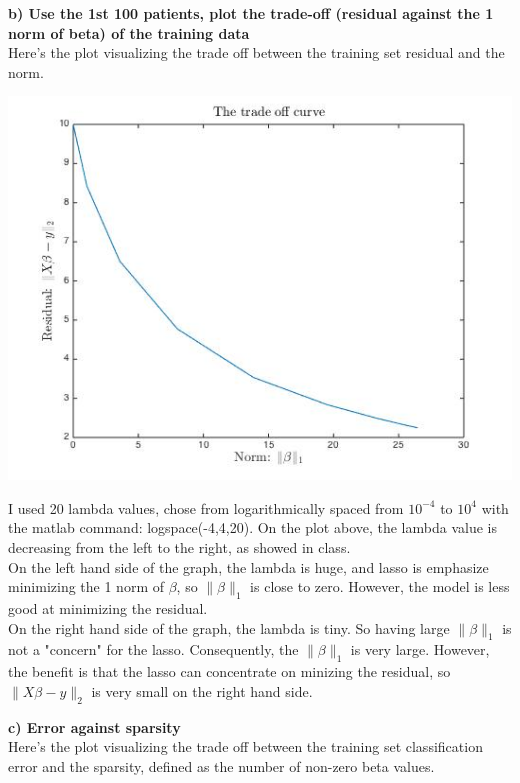 \documentclass[paper=a4, fontsize=11pt]{scrartcl} %
\numberwithin{equation}{section} %
\numberwithin{figure}{section} %
\numberwithin{table}{section} %
\begin{document}
\newpage
\textbf{b) Use the 1st 100 patients, plot the trade-off (residual against the 1 norm of beta) of the training data}\\

Here's the plot visualizing the trade off between the training set residual and the norm. 
\begin{center}
\includegraphics[scale=.5]{hw6_2b_tradeoff.jpg}
\end{center}

I used 20 lambda values, chose from logarithmically spaced from $10^{-4}$ to $10^{4}$ with the matlab command: logspace(-4,4,20). On the plot above, the lambda value is decreasing from the left to the right, as showed in class. \\

On the left hand side of the graph, the lambda is huge, and lasso is emphasize minimizing the 1 norm of $\beta$, so $\|\beta\|_1$ is close to zero. However, the model is less good at minimizing the residual. \\

On the right hand side of the graph, the lambda is tiny. So having large $\|\beta\|_1$ is not a "concern" for the lasso. Consequently, the $\|\beta\|_1$  is very large. However, the benefit is that the lasso can concentrate on minizing the residual, so $\| X\beta - y \|_2$ is very small on the right hand side. 

\newpage
\textbf{c) Error against sparsity }\\ 

Here's the plot visualizing the trade off between the training set classification error and the sparsity, defined as the number of non-zero beta values.\\ 
\end{document}

